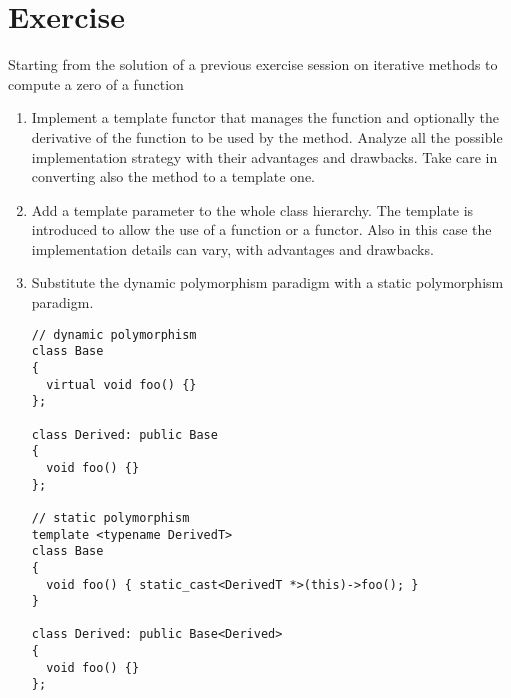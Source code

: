 \section*{Exercise}

Starting from the solution of a previous exercise session on iterative methods
to compute a zero of a function

\begin{enumerate}

  \item Implement a template functor that manages the function and optionally
  the derivative of the function to be used by the method. Analyze all the
  possible implementation strategy with their advantages and drawbacks. Take
  care in converting also the  method to a template one.

  \item Add a template parameter to the whole class hierarchy. The template is
  introduced to allow the use of a function or a functor. Also in this case the
  implementation details can vary, with advantages and drawbacks.

  \item Substitute the dynamic polymorphism paradigm with a static polymorphism
  paradigm.
\begin{lstlisting}
// dynamic polymorphism
class Base
{
  virtual void foo() {}
};

class Derived: public Base
{
  void foo() {}
};

// static polymorphism
template <typename DerivedT>
class Base
{
  void foo() { static_cast<DerivedT *>(this)->foo(); }
}

class Derived: public Base<Derived>
{
  void foo() {}
};

\end{lstlisting}

\end{enumerate}

